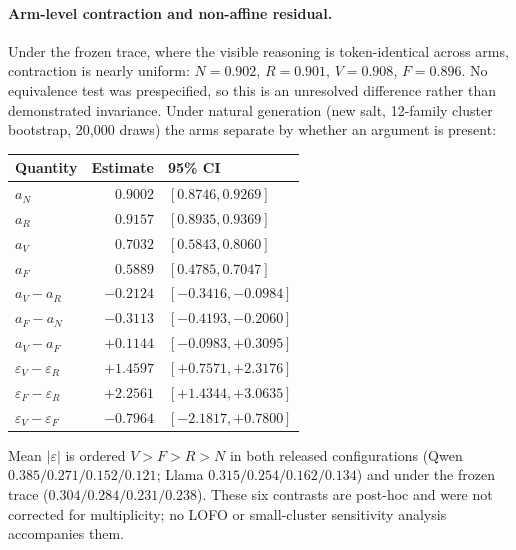 \documentclass[letterpaper]{article}
\begin{document}
\paragraph{Arm-level contraction and non-affine residual.}
Under the frozen trace, where the visible reasoning is token-identical across arms, contraction is nearly uniform: $N=0.902$, $R=0.901$, $V=0.908$, $F=0.896$. No equivalence test was prespecified, so this is an unresolved difference rather than demonstrated invariance. Under natural generation (new salt, 12-family cluster bootstrap, 20{,}000 draws) the arms separate by whether an argument is present:
\begin{center}
\small
\begin{tabular}{@{}lrl@{}}
\toprule
Quantity & Estimate & 95\% CI \\
\midrule
$a_{N}$ & $0.9002$ & $[0.8746,0.9269]$ \\
$a_{R}$ & $0.9157$ & $[0.8935,0.9369]$ \\
$a_{V}$ & $0.7032$ & $[0.5843,0.8060]$ \\
$a_{F}$ & $0.5889$ & $[0.4785,0.7047]$ \\
\midrule
$a_{V}-a_{R}$ & $-0.2124$ & $[-0.3416,-0.0984]$ \\
$a_{F}-a_{N}$ & $-0.3113$ & $[-0.4193,-0.2060]$ \\
$a_{V}-a_{F}$ & $+0.1144$ & $[-0.0983,+0.3095]$ \\
$\varepsilon_{V}-\varepsilon_{R}$ & $+1.4597$ & $[+0.7571,+2.3176]$ \\
$\varepsilon_{F}-\varepsilon_{R}$ & $+2.2561$ & $[+1.4344,+3.0635]$ \\
$\varepsilon_{V}-\varepsilon_{F}$ & $-0.7964$ & $[-2.1817,+0.7800]$ \\
\bottomrule
\end{tabular}
\end{center}
\noindent Mean $|\varepsilon|$ is ordered $V>F>R>N$ in both released configurations (Qwen $0.385/0.271/0.152/0.121$; Llama $0.315/0.254/0.162/0.134$) and under the frozen trace ($0.304/0.284/0.231/0.238$). These six contrasts are post-hoc and were not corrected for multiplicity; no LOFO or small-cluster sensitivity analysis accompanies them.
\end{document}
